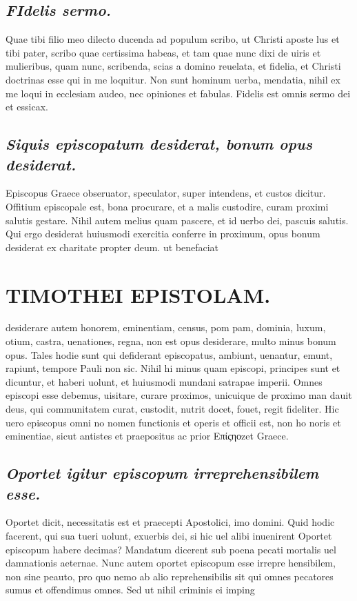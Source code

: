 \documentclass{article}
\begin{document}
\begin{pages}
\subsection*{\textit{\huge\textbf{F}\normalsize Idelis sermo. }}\pstart Quae tibi filio meo dilecto ducenda ad populum scribo, ut Christi aposte lus et tibi pater, scribo quae certissima habeas, et tam quae nunc dixi de uiris et mulieribus, quam nunc, scribenda, scias a domino reuelata, et fidelia, et Christi doctrinas esse qui in me loquitur. Non sunt hominum uerba, mendatia, nihil ex me loqui in ecclesiam audeo, nec opiniones et fabulas. Fidelis est omnis sermo dei et essicax.  \pend
{}
{}
\subsection*{\textit{Siquis episcopatum desiderat, bonum opus desiderat. }}\pstart Episcopus Graece obseruator, speculator, super intendens, et custos dicitur. Offitium episcopale est, bona procurare, et a malis custodire, curam proximi salutis gestare. Nihil autem melius quam pascere, et id uerbo dei, pascuis salutis. Qui ergo desiderat huiusmodi exercitia conferre in proximum, opus bonum desiderat ex charitate propter deum. ut benefaciat  \pend
\section*{TIMOTHEI EPISTOLAM. }
\marginpar{[ p.65 ]}\pstart desiderare autem honorem, eminentiam, census, pom pam, dominia, luxum, otium, castra, uenationes, regna, non est opus desiderare, multo minus bonum opus. Tales hodie sunt qui defiderant episcopatus, ambiunt, uenantur, emunt, rapiunt, tempore Pauli non sic. Nihil hi minus quam episcopi, principes sunt et dicuntur, et haberi uolunt, et huiusmodi mundani satrapae imperii. Omnes episcopi esse debemus, uisitare, curare proximos, unicuique de proximo man dauit deus, qui communitatem curat, custodit, nutrit docet, fouet, regit fideliter. Hic uero episcopus omni no nomen functionis et operis et officii est, non ho noris et eminentiae, sicut antistes et praepositus ac prior Επίςηοzet Graece.  \pend
{}
{}
\subsection*{\textit{Oportet igitur episcopum irreprehensibilem esse. }}\pstart Oportet dicit, necessitatis est et praecepti Apostolici, imo domini. Quid hodic facerent, qui sua tueri uolunt, exuerbis dei, si hic uel alibi inuenirent Oportet episcopum habere decimas? Mandatum dicerent sub poena pecati mortalis uel damnationis aeternae. Nunc autem oportet episcopum esse irrepre hensibilem, non sine peauto, pro quo nemo ab alio reprehensibilis sit qui omnes pecatores sumus et offendimus omnes. Sed ut nihil criminis ei imping  \pend

\end{pages}
\end{document}
